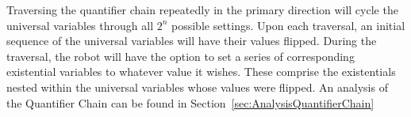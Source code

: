 Traversing the quantifier chain
repeatedly in the primary direction will cycle the universal variables through all $2^n$ possible settings.
Upon each traversal, an initial sequence of the universal variables will have their values flipped.
During the traversal, the robot will have the option to set a series of corresponding existential variables to whatever value it wishes. These comprise the existentials nested within the universal variables whose values were flipped. An analysis of the Quantifier Chain can be found in Section~\ref{sec:AnalysisQuantifierChain}
%
%
%
%
%
%
